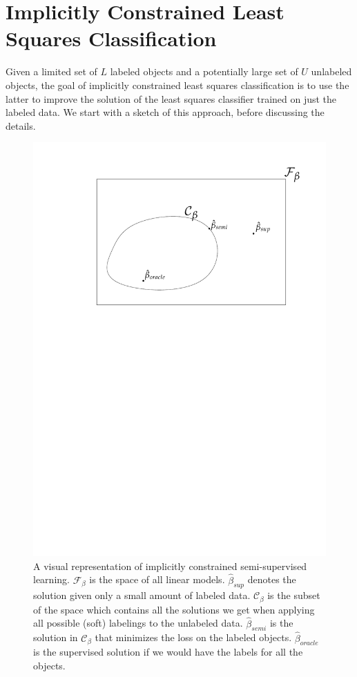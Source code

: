 \documentclass[twoside]{memoir}\usepackage[]{graphicx}\usepackage{xcolor}
\newcommand{\Cb}{\mathcal{C}_{\beta}}
\newcommand{\Nunl}{U}
\newcommand{\Nlab}{L}
\begin{document}
\section{Implicitly Constrained Least Squares Classification}
\label{section:overview}
Given a limited set of $\Nlab$ labeled objects and a potentially large set of $\Nunl$ unlabeled objects, the goal of implicitly constrained least squares classification is to use the latter to improve the solution of the least squares classifier trained on just the labeled data. We start with a sketch of this approach, before discussing the details.

\begin{figure}[ht] 
  \centering
      \includegraphics[width=1.0\textwidth]{chapter1/constrainedspace.pdf}
  \caption{A visual representation of implicitly constrained semi-supervised learning. $\mathcal{F}_{\beta}$ is the space of all linear models. $\hat{\beta}_{sup}$ denotes the solution given only a small amount of labeled data. $\Cb$ is the subset of the space which contains all the solutions we get when applying all possible (soft) labelings to the unlabeled data. $\hat{\beta}_{semi}$ is the solution in $\Cb$ that minimizes the loss on the labeled objects. $\hat{\beta}_{oracle}$ is the supervised solution if we would have the labels for all the objects.} \label{fig:constrainedsubset}
\end{figure}
\end{document}
